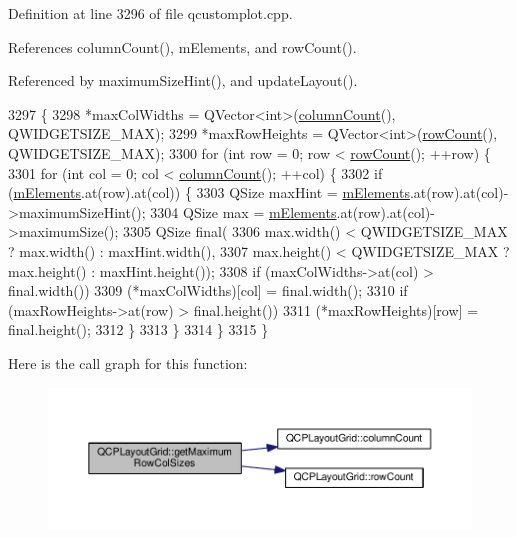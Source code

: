 Definition at line 3296 of file qcustomplot.\+cpp.



References column\+Count(), m\+Elements, and row\+Count().



Referenced by maximum\+Size\+Hint(), and update\+Layout().


\begin{DoxyCode}
3297                                                                              \{
3298   *maxColWidths = QVector<int>(\hyperlink{class_q_c_p_layout_grid_ac39074eafd148b82d0762090f258189e}{columnCount}(), QWIDGETSIZE\_MAX);
3299   *maxRowHeights = QVector<int>(\hyperlink{class_q_c_p_layout_grid_af8e6c7a05864ebe610c87756c7b9079c}{rowCount}(), QWIDGETSIZE\_MAX);
3300   \textcolor{keywordflow}{for} (\textcolor{keywordtype}{int} row = 0; row < \hyperlink{class_q_c_p_layout_grid_af8e6c7a05864ebe610c87756c7b9079c}{rowCount}(); ++row) \{
3301     \textcolor{keywordflow}{for} (\textcolor{keywordtype}{int} col = 0; col < \hyperlink{class_q_c_p_layout_grid_ac39074eafd148b82d0762090f258189e}{columnCount}(); ++col) \{
3302       \textcolor{keywordflow}{if} (\hyperlink{class_q_c_p_layout_grid_a2ec4664bcfb5d479255e50f0c074f7c9}{mElements}.at(row).at(col)) \{
3303         QSize maxHint = \hyperlink{class_q_c_p_layout_grid_a2ec4664bcfb5d479255e50f0c074f7c9}{mElements}.at(row).at(col)->maximumSizeHint();
3304         QSize max = \hyperlink{class_q_c_p_layout_grid_a2ec4664bcfb5d479255e50f0c074f7c9}{mElements}.at(row).at(col)->maximumSize();
3305         QSize \textcolor{keyword}{final}(
3306             max.width() < QWIDGETSIZE\_MAX ? max.width() : maxHint.width(),
3307             max.height() < QWIDGETSIZE\_MAX ? max.height() : maxHint.height());
3308         \textcolor{keywordflow}{if} (maxColWidths->at(col) > \textcolor{keyword}{final}.width())
3309           (*maxColWidths)[col] = \textcolor{keyword}{final}.width();
3310         \textcolor{keywordflow}{if} (maxRowHeights->at(row) > \textcolor{keyword}{final}.height())
3311           (*maxRowHeights)[row] = \textcolor{keyword}{final}.height();
3312       \}
3313     \}
3314   \}
3315 \}
\end{DoxyCode}


Here is the call graph for this function\+:\nopagebreak
\begin{figure}[H]
\begin{center}
\leavevmode
\includegraphics[width=350pt]{class_q_c_p_layout_grid_af348d903e3b8bc416f1fe1b8125d1173_cgraph}
\end{center}
\end{figure}




